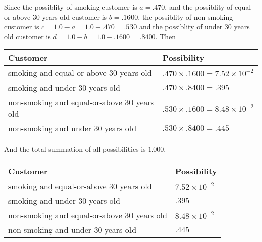 \documentclass[12pt]{article}
\begin{document}
 
 
 
 
\noindent{}
 
 

Since the possiblity of  %
smoking customer is $ a =  %
.470 $,
and the possiblity of  %
equal-or-above 30 years old customer is $ b =  %
.1600 $,
the possiblity of  %
non-smoking customer is $ c = 1.0 - a = 1.0 -
.470
=  %
.530 $ and the possiblity of  %
under 30 years old
customer is $ d = 1.0 - b = 1.0 -  %
.1600 =  %
.8400  $.
Then
 
\noindent
\begin{tabular}{|l|l|}
\hline
Customer & Possibility \\
\hline
smoking  and  %
equal-or-above 30 years old  &
  $ %
.470 \times  %
.1600 =  %
7.52 \times 10^{-2}$ \\
\hline
smoking  and  %
under 30 years old &
  $ %
.470 \times  %
.8400 =  %
.395$ \\
\hline
 non-smoking and  %
equal-or-above 30 years old  &
  $ %
.530 \times  %
.1600 =  %
8.48 \times 10^{-2}$ \\
\hline
 non-smoking and  %
under 30 years old &
  $ %
.530 \times  %
.8400 =  %
.445$ \\
\hline
\end{tabular}
 
\noindent
And the total summation of all possibilities is $  %
1.000 $.
 
 
 
 
\noindent{}
 
 

 
 
 
\noindent{}
 
 

 
\noindent
\begin{tabular}{|l|l|}
\hline
Customer & Possibility \\
\hline
smoking  and  %
equal-or-above 30 years old &
  $ %
7.52 \times 10^{-2}$ \\
\hline
smoking  and  %
under 30 years old &
  $ %
.395$ \\
\hline
 non-smoking and  %
equal-or-above 30 years old &
  $ %
8.48 \times 10^{-2}$ \\
\hline
 non-smoking and  %
under 30 years old &
  $ %
.445$ \\
\hline
\end{tabular}
 
\end{document}
